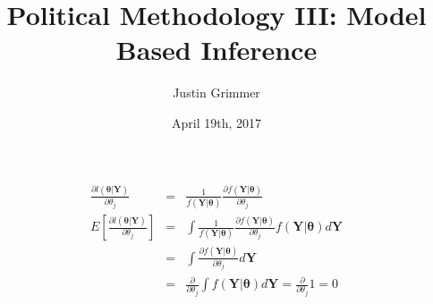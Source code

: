 \documentclass{beamer}
\title[Methodology III] %
{Political Methodology III: Model Based Inference}
\author{Justin Grimmer}
\institute[Stanford University]{Associate Professor\\Department of Political Science \\  Stanford University}
\date{April 19th, 2017}
\begin{document}
\begin{frame}
\titlepage
\end{frame}


\begin{frame}


\begin{eqnarray}
\frac{\partial l(\boldsymbol{\theta}| \boldsymbol{Y})  }{\partial \theta_{j} } & = & \frac{1}{f(\boldsymbol{Y} | \boldsymbol{\theta})} \frac{\partial f(\boldsymbol{Y} | \boldsymbol{\theta}) }{ \partial \theta_{j} } \nonumber \\
E\left[\frac{\partial l(\boldsymbol{\theta}| \boldsymbol{Y})  }{\partial \theta_{j} } \right] & = & \int  \frac{1}{f(\boldsymbol{Y} | \boldsymbol{\theta})} \frac{\partial f(\boldsymbol{Y} | \boldsymbol{\theta}) }{ \partial \theta_{j} } f(\boldsymbol{Y} | \boldsymbol{\theta}) d\boldsymbol{Y} \nonumber \\
& = & \int \frac{\partial f(\boldsymbol{Y} | \boldsymbol{\theta}) }{ \partial \theta_{j} } d\boldsymbol{Y} \nonumber \\
& = & \frac{\partial }{\partial \theta_{j} } \int f(\boldsymbol{Y}| \boldsymbol{\theta}) d\boldsymbol{Y}  = \frac{\partial }{\partial \theta_{j} } 1 = 0 \nonumber 
\end{eqnarray}


\end{frame}
\end{document}
